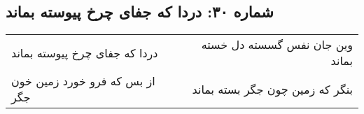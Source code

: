 \begin{center}
\section*{شماره ۳۰: دردا که جفای چرخ پیوسته بماند}
\label{sec:030}
\begin{longtable}{l p{0.5cm} r}
دردا که جفای چرخ پیوسته بماند
&&
وین جان نفس گسسته دل خسته بماند
\\
از بس که فرو خورد زمین خون جگر
&&
بنگر که زمین چون جگر بسته بماند
\\
\end{longtable}
\end{center}
